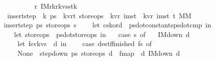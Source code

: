 \begin{isabellebody}
\ \ \ \ \ \ \ \ {\isacharparenleft}{\isacharpercent}\ r{}{\isachardot}\ {\isacharparenleft}IM{}{\isacharparenleft}{\isacharparenleft}r{}{\isacharcomma}k{\isacharcomma}r{}{\isacharparenright}{\isacharcomma}kvs{}{\isacharparenright}{\isacharcomma}stk{\isacharprime}{\isacharparenright}{\isacharparenright}{\isacharparenright}{\isacharparenright}\isanewline
\ \ \ \ {\isacharparenright}\isanewline
\ \ {\isacharparenright}\isanewline
{\isacharparenright}{\isachardoublequoteclose}\isanewline
\isanewline
{}\isamarkupfalse%
\ insert{\isacharunderscore}step\ {\isacharcolon}{\isacharcolon}\ {\isachardoublequoteopen}{\isacharprime}k\ ps{}\ {\isasymRightarrow}\ {\isacharparenleft}{\isacharprime}k{\isacharcomma}{\isacharprime}v{\isacharcomma}{\isacharprime}r{\isacharcomma}{\isacharprime}t{\isacharparenright}\ store{\isacharunderscore}ops\ {\isasymRightarrow}\ {\isacharparenleft}{\isacharprime}k{\isacharcomma}{\isacharprime}v{\isacharcomma}{\isacharprime}r{\isacharparenright}\ imst\ {\isasymRightarrow}\ {\isacharparenleft}{\isacharparenleft}{\isacharprime}k{\isacharcomma}{\isacharprime}v{\isacharcomma}{\isacharprime}r{\isacharparenright}\ imst{\isacharcomma}\ {\isacharprime}t{\isacharparenright}\ MM{\isachardoublequoteclose}\ \isanewline
{\isachardoublequoteopen}insert{\isacharunderscore}step\ ps{}\ store{\isacharunderscore}ops\ s\ {\isacharequal}\ {\isacharparenleft}\isanewline
\ \ let\ {\isacharparenleft}cs{\isacharcomma}k{\isacharunderscore}ord{\isacharparenright}\ {\isacharequal}\ {\isacharparenleft}ps{}{\isacharbar}{\isachargreater}dot{\isacharunderscore}constants{\isacharcomma}ps{}{\isacharbar}{\isachargreater}dot{\isacharunderscore}cmp{\isacharparenright}\ in\isanewline
\ \ {\isacharparenleft}{\isacharasterisk}\ let\ store{\isacharunderscore}ops\ {\isacharequal}\ ps{}{\isacharbar}{\isachargreater}dot{\isacharunderscore}store{\isacharunderscore}ops\ in\ {\isacharasterisk}{\isacharparenright}\isanewline
\ \ case\ s\ of\ \isanewline
\ \ IM{\isacharunderscore}down\ d\ {\isasymRightarrow}\ {\isacharparenleft}\isanewline
\ \ \ \ let\ {\isacharparenleft}fs{\isacharcomma}{\isacharparenleft}v{\isacharcomma}kvs{}{\isacharparenright}{\isacharparenright}\ {\isacharequal}\ d\ in\isanewline
\ \ \ \ case\ {\isacharparenleft}dest{\isacharunderscore}f{\isacharunderscore}finished\ fs{\isacharparenright}\ of\ \isanewline
\ \ \ \ None\ {\isasymRightarrow}\ {\isacharparenleft}step{\isacharunderscore}down\ ps{}\ store{\isacharunderscore}ops\ d\ {\isacharbar}{\isachargreater}\ fmap\ {\isacharparenleft}{\isacharpercent}\ d{\isachardot}\ IM{\isacharunderscore}down\ d{\isacharparenright}{\isacharparenright}\isanewline

\end{isabellebody}
